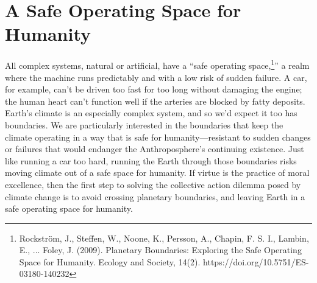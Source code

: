 
\section{A Safe Operating Space for Humanity}
All complex systems, natural or artificial, have a ``safe operating space,\footnote{Rockstr\"{o}m, J., Steffen, W., Noone, K., Persson, A., Chapin, F. S. I., Lambin, E., ... Foley, J. (2009). Planetary Boundaries: Exploring the Safe Operating Space for Humanity. Ecology and Society, 14(2). https://doi.org/10.5751/ES-03180-140232}'' a realm where the machine runs predictably and with a low risk of sudden failure. A car, for example, can't be driven too fast for too long without damaging the engine; the human heart can't function well if the arteries are blocked by fatty deposits. Earth's climate is an especially complex system, and so we'd expect it too has boundaries. We are particularly interested in the boundaries that keep the climate operating in a way that is safe for humanity---resistant to sudden changes or failures that would endanger the Anthroposphere's continuing existence. Just like running a car too hard, running the Earth through those boundaries risks moving climate out of a safe space for humanity. If virtue is the practice of moral excellence, then the first step to solving the collective action dilemma posed by climate change is to avoid crossing planetary boundaries, and leaving Earth in a safe operating space for humanity.
 
